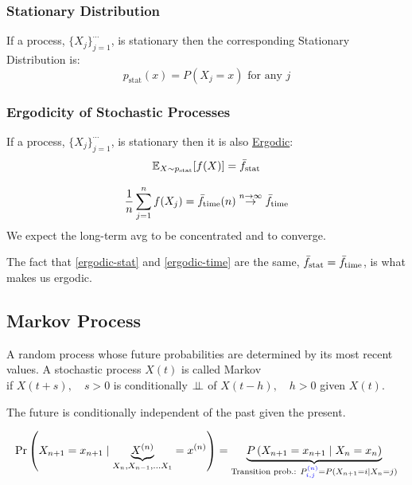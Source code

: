 \subsubsection{Stationary Distribution}
\begin{shaded}
If a process, $\{X_j\}_{j=1}^{\cdots}$, is stationary then the corresponding Stationary Distribution is: 
\begin{equation}
p_{\text{stat}}(x) = P(X_j = x) \text{ for any $j$}
\end{equation}
\end{shaded}

\subsubsection{Ergodicity of Stochastic Processes}
\begin{shaded}
If a process, $\{X_j\}_{j=1}^{\cdots}$, is stationary then it is also \underline{Ergodic}: 
\begin{equation}
\label{ergodic-stat}
\mathbb{E}_{X\sim p_{\text{stat}}}[f(X)] = \Bar{f}_{\text{stat}}
\end{equation}

\begin{equation}
\label{ergodic-time}
\frac1n \sum_{j=1}^n f(X_j) = \Bar{f}_{\text{time}}(n) \stackrel{\small{n\to\infty}}{\to} \Bar{f}_{\text{time}}
\end{equation}
We expect the long-term avg to be concentrated and to converge.

The fact that \eqref{ergodic-stat} and \eqref{ergodic-time} are the same, $\Bar{f}_{\text{stat}}=\Bar{f}_{\text{time}}$, is what makes us ergodic.
\end{shaded}

\subsection{Markov Process}
A random process whose future probabilities are determined by its most recent values. A stochastic process $X(t)$ is called Markov \\
if $X(t+s),\quad s>0$ is conditionally $\mathrel{\perp\!\!\!\perp}$ of $X(t-h),\quad h>0$ given $X(t)$.
\begin{shaded}
The future is conditionally independent of the past given the present.
\end{shaded}

\begin{equation}
\operatorname{Pr}\left(X_{n+1}=x_{n+1} \mid \underbrace{X^{(n)}}_{
X_{n}, X_{n-1}, \ldots X_1}=x^{(n)}\right)
=
\underbrace{P\left(X_{n+1}=x_{n+1} \mid X_{n}=x_n\right)}_{\text{Transition prob.: } 
P_{i, j}^{\color{blue}{(n)}}=P\left(X_{n+1}=i \mid X_n=j\right)}
\end{equation}

